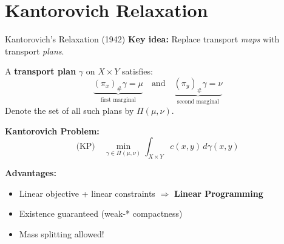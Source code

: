 \documentclass[aspectratio=169]{beamer}
\begin{document}
\section{Kantorovich Relaxation}

\begin{frame}{Kantorovich's Relaxation (1942)}
\textbf{Key idea:} Replace transport \emph{maps} with transport \emph{plans}.

\vspace{0.3cm}
A \textbf{transport plan} $\gamma$ on $X \times Y$ satisfies:
\[
\underbrace{(\pi_x)_\#\gamma = \mu}_{\text{first marginal}} \quad \text{and} \quad \underbrace{(\pi_y)_\#\gamma = \nu}_{\text{second marginal}}
\]
Denote the set of all such plans by $\Pi(\mu, \nu)$.

\vspace{0.3cm}
\textbf{Kantorovich Problem:}
\[
\text{(KP)} \quad \min_{\gamma \in \Pi(\mu,\nu)} \int_{X \times Y} c(x,y) \, d\gamma(x,y)
\]

\vspace{0.3cm}
\textbf{Advantages:}
\begin{itemize}
    \item Linear objective + linear constraints $\Rightarrow$ \textbf{Linear Programming}
    \item Existence guaranteed (weak-* compactness)
    \item Mass splitting allowed!
\end{itemize}
\end{frame}
\end{document}
